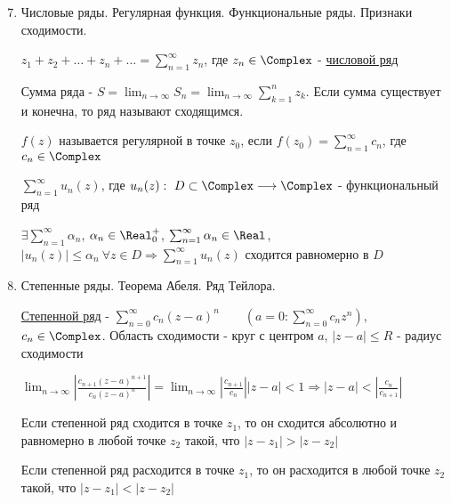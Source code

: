 \begin{enumerate}
    \setcounter{enumi}{6}

    \item Числовые ряды. Регулярная функция. Функциональные ряды. Признаки сходимости.

     $z_1 + z_2 + \dots + z_n + \dots = \sum_{n = 1}^\infty z_n$, где $z_n \in \Complex$ - \hyperlink{complex_series}{числовой ряд}

     Сумма ряда - $S = \lim_{n \to \infty} S_n = \lim_{n \to \infty} \sum_{k = 1}^n z_k$. Если сумма существует и конечна, то ряд называют сходящимся. 

    \Defs $f(z)$ называется регулярной в точке $z_0$, если $f(z_0) = \sum_{n = 1}^\infty c_n$, где $c_n \in \Complex$

    \Defs $\sum_{n = 1}^\infty u_n(z)$, где $u_n(z) : \ D \subset \Complex \longrightarrow \Complex$ - функциональный ряд

    \begin{MyTheorem}
    
        $\exists \sum_{n = 1}^\infty \alpha_n$, $\alpha_n \in \Real_0^+$, $\sum_{n = 1}^\infty \alpha_n \in \Real$,
        $|u_n(z)| \leq \alpha_n \ \forall z \in D \Longrightarrow \sum_{n = 1}^\infty u_n(z)$ сходится равномерно в $D$
    \end{MyTheorem}

    \item Степенные ряды. Теорема Абеля. Ряд Тейлора.

    \Defs \hyperlink{complex_power_series}{Степенной ряд} - $\sum_{n = 0}^\infty c_n (z - a)^n \qquad \left(a = 0: \sum_{n = 0}^\infty c_n z^n\right)$, $c_n \in \Complex$. Область сходимости - круг с центром $a$, $|z - a| \leq R$ - радиус сходимости 

    $\lim_{n \to \infty} \left|\frac{c_{n + 1} (z - a)^{n + 1}}{c_n (z - a)^n}\right| = \lim_{n \to \infty} \left|\frac{c_{n + 1}}{c_n}\right| |z - a| < 1 \Longrightarrow |z - a| < \left|\frac{c_n}{c_{n + 1}}\right|$

    \begin{MyTheorem}
        
        Если степенной ряд сходится в точке $z_1$, то он сходится абсолютно и равномерно 
        в любой точке $z_2$ такой, что $|z - z_1| > |z - z_2|$

        Если степенной ряд расходится в точке $z_1$, то он расходится
        в любой точке $z_2$ такой, что $|z - z_1| < |z - z_2|$
    \end{MyTheorem}


\end{enumerate}
